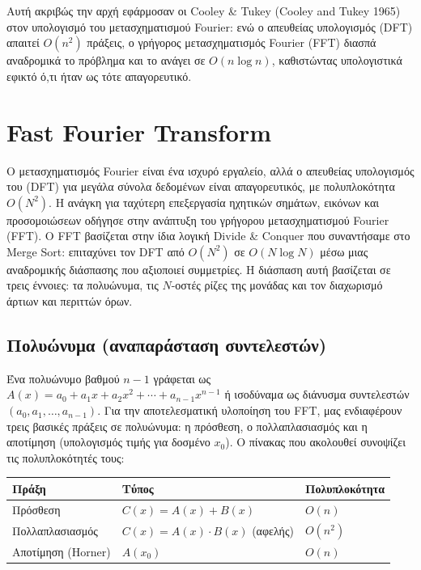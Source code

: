 \documentclass[a4paper, 11pt]{article}
\begin{document}
Αυτή ακριβώς την αρχή εφάρμοσαν οι Cooley \& Tukey (Cooley and Tukey
1965) στον υπολογισμό του μετασχηματισμού Fourier: ενώ ο απευθείας
υπολογισμός (DFT) απαιτεί \(O(n^2)\) πράξεις, ο γρήγορος μετασχηματισμός
Fourier (FFT) διασπά αναδρομικά το πρόβλημα και το ανάγει σε
\(O(n \log n)\), καθιστώντας υπολογιστικά εφικτό ό,τι ήταν ως τότε
απαγορευτικό.

\section{Fast Fourier Transform}\label{fast-fourier-transform}

Ο μετασχηματισμός Fourier είναι ένα ισχυρό εργαλείο, αλλά ο απευθείας
υπολογισμός του (DFT) για μεγάλα σύνολα δεδομένων είναι απαγορευτικός,
με πολυπλοκότητα \(O(N^2)\). Η ανάγκη για ταχύτερη επεξεργασία ηχητικών
σημάτων, εικόνων και προσομοιώσεων οδήγησε στην ανάπτυξη του γρήγορου
μετασχηματισμού Fourier (FFT). Ο FFT βασίζεται στην ίδια λογική Divide
\& Conquer που συναντήσαμε στο Merge Sort: επιταχύνει τον DFT από
\(O(N^2)\) σε \(O(N \log N)\) μέσω μιας αναδρομικής διάσπασης που
αξιοποιεί συμμετρίες. Η διάσπαση αυτή βασίζεται σε τρεις έννοιες: τα
πολυώνυμα, τις \(N\)-οστές ρίζες της μονάδας και τον διαχωρισμό άρτιων
και περιττών όρων.

\subsection{Πολυώνυμα (αναπαράσταση
συντελεστών)}\label{ux3c0ux3bfux3bbux3c5ux3ceux3bdux3c5ux3bcux3b1-ux3b1ux3bdux3b1ux3c0ux3b1ux3c1ux3acux3c3ux3c4ux3b1ux3c3ux3b7-ux3c3ux3c5ux3bdux3c4ux3b5ux3bbux3b5ux3c3ux3c4ux3ceux3bd}

Ένα πολυώνυμο βαθμού \(n-1\) γράφεται ως
\(A(x) = a_0 + a_1 x + a_2 x^2 + \cdots + a_{n-1} x^{n-1}\) ή ισοδύναμα
ως διάνυσμα συντελεστών \((a_0, a_1, \ldots, a_{n-1})\). Για την
αποτελεσματική υλοποίηση του FFT, μας ενδιαφέρουν τρεις βασικές πράξεις
σε πολυώνυμα: η πρόσθεση, ο πολλαπλασιασμός και η αποτίμηση (υπολογισμός
τιμής για δοσμένο \(x_0\)). Ο πίνακας που ακολουθεί συνοψίζει τις
πολυπλοκότητές τους:

\begin{longtable}[]{@{}lll@{}}
\toprule\noalign{}
Πράξη & Τύπος & Πολυπλοκότητα \\
\midrule\noalign{}
\endhead
\bottomrule\noalign{}
\endlastfoot
Πρόσθεση & \(C(x) = A(x) + B(x)\) & \(O(n)\) \\
Πολλαπλασιασμός & \(C(x) = A(x) \cdot B(x)\) (αφελής) & \(O(n^2)\) \\
Αποτίμηση (Horner) & \(A(x_0)\) & \(O(n)\) \\
\end{longtable}
\end{document}
